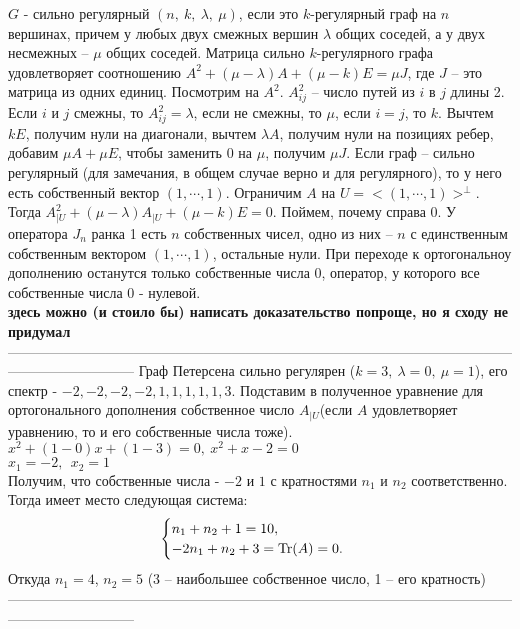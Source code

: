 	
$G$ - сильно регулярный $(n,~k,~\lambda,~\mu)$, если это $k$-регулярный граф на $n$ вершинах, причем у любых двух смежных вершин $\lambda$ общих соседей, а у двух несмежных -- $\mu$ общих соседей.
\thrm Матрица сильно $k$-регулярного графа удовлетворяет соотношению $A^2+(\mu-\lambda)A + (\mu-k)E=\mu J$, где $J$ -- это матрица из одних единиц.
\ethrm
\proof Посмотрим на $A^2$. $A^2_{ij}$ -- число путей из $i$ в $j$ длины 2. Если $i$ и $j$ смежны, то $A^2_{ij} = \lambda$, если не смежны, то $\mu$, если $i = j$, то $k$. Вычтем $kE$, получим нули на диагонали, вычтем $\lambda A$, получим нули на позициях ребер, добавим $\mu A + \mu E$, чтобы заменить 0 на $\mu$, получим $\mu J$.
\endproof
\rm Если граф -- сильно регулярный (для замечания, в общем случае верно и для регулярного), то у него есть собственный вектор $(1,\cdots,1)$. Ограничим $A$ на $U = <(1,\cdots,1)>^{\bot}$.
Тогда $A_{|U}^2 + (\mu-\lambda)A_{|U} + (\mu-k)E = 0$. Поймем, почему справа 0. У оператора $J_n$ ранка 1 есть $n$ собственных чисел, одно из них -- $n$ с единственным собственным вектором $(1,\cdots,1)$, остальные нули. При переходе к ортогональноу дополнению останутся только собственные числа 0, оператор, у которого все собственные числа 0 - нулевой.\\ 
\textbf{ здесь можно (и стоило бы) написать доказательство попроще, но я сходу не придумал}
\erm
---------------------------------------------------------------------------------------------------------------------------------------
\crl Граф Петерсена сильно регулярен ($k = 3,~\lambda=0,~\mu=1$), его спектр - ${-2,-2,-2,-2,1,1,1,1,1,3}$.
\ecrl
\proof
Подставим в полученное уравнение для ортогонального дополнения собственное число $A_{|U}$(если $A$ удовлетворяет уравнению, то и его собственные числа тоже). \\
$x^2+(1-0)x+(1-3)=0,~x^2+x-2=0$\\
$x_1 = -2,~~x_2 = 1$\\
Получим, что собственные числа - $-2$ и $1$ с кратностями $n_1$ и $n_2$ соответственно. Тогда имеет место следующая система:
\begin{equation*}
    \begin{cases}
        n_1+n_2+1=10,\\
        -2n_1 + n_2 + 3 = \operatorname{Tr}(A) = 0.
    \end{cases}
\end{equation*}
Откуда $n_1 = 4$, $n_2 = 5$ (3 -- наибольшее собственное число, 1 -- его кратность)
\endproof
---------------------------------------------------------------------------------------------------------------------------------------
